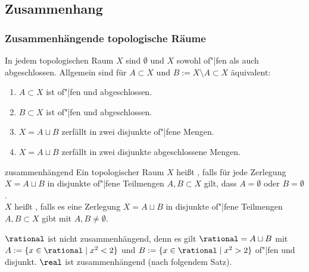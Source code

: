 \subsection{%
    Zusammenhang%
}

\subsubsection{%
    Zusammenhängende topologische Räume%
}

\begin{Bem}
    In jedem topologischen Raum $X$ sind $\emptyset$ und $X$ sowohl of"|fen
    als auch abgeschlossen.
    Allgemein sind für $A \subset X$ und $B := X \setminus A \subset X$
    äquivalent:
    \begin{enumerate}
        \item
        $A \subset X$ ist of"|fen und abgeschlossen.
        
        \item
        $B \subset X$ ist of"|fen und abgeschlossen.
        
        \item
        $X = A \sqcup B$ zerfällt in zwei disjunkte of"|fene Mengen.
        
        \item
        $X = A \sqcup B$ zerfällt in zwei disjunkte abgeschlossene Mengen.
    \end{enumerate}
\end{Bem}

\begin{Def}{zusammenhängend}
    Ein topologischer Raum $X$ heißt
    , falls für jede Zerlegung
    $X = A \sqcup B$ in disjunkte of"|fene Teilmengen $A, B \subset X$ gilt,
    dass $A = \emptyset$ oder $B = \emptyset$. \\
    $X$ heißt , falls es eine Zerlegung
    $X = A \sqcup B$ in disjunkte of"|fene Teilmengen $A, B \subset X$ gibt
    mit $A, B \not= \emptyset$.
\end{Def}

\begin{Bsp}
    $\rational$ ist nicht zusammenhängend, denn es gilt
    $\rational = A \sqcup B$ mit $A := \{x \in \rational \;|\; x^2 < 2\}$
    und $B := \{x \in \rational \;|\; x^2 > 2\}$ of"|fen und disjunkt.
    $\real$ ist zusammenhängend (nach folgendem Satz).
\end{Bsp}

\linie

